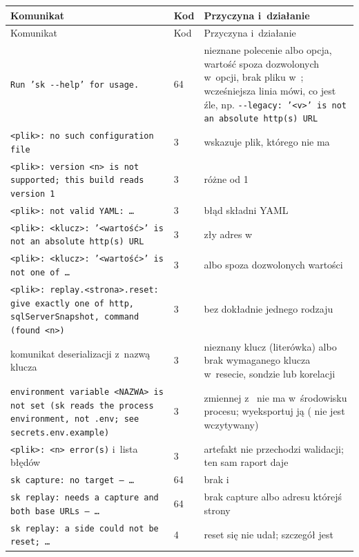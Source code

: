 {\footnotesize
\begin{xltabular}{\linewidth}{@{}>{\raggedright\arraybackslash}p{6.4cm} l >{\raggedright\arraybackslash}X@{}}
\toprule
Komunikat & Kod & Przyczyna i~działanie \\
\midrule
\endfirsthead
\toprule
Komunikat & Kod & Przyczyna i~działanie \\
\midrule
\endhead
\bottomrule
\endlastfoot
\texttt{Run 'sk -{}-help' for usage.} & 64 & nieznane polecenie albo opcja, wartość spoza
dozwolonych w~opcji, brak pliku w~; wcześniejsza linia mówi, co jest
źle, np. \texttt{-{}-legacy: '<v>' is not an absolute http(s) URL} \\
\texttt{<plik>: no such configuration file} & 3 &  wskazuje plik,
którego nie ma \\
\texttt{<plik>: version <n> is not supported; this build reads version 1} & 3 &
 różne od 1 \\
\texttt{<plik>: not valid YAML: …} & 3 & błąd składni YAML \\
\texttt{<plik>: <klucz>: '<wartość>' is not an absolute http(s) URL} & 3 & zły adres
w~ \\
\texttt{<plik>: <klucz>: '<wartość>' is not one of …} & 3 &  albo
 spoza dozwolonych wartości \\
\texttt{<plik>: replay.<strona>.reset: give exactly one of http, sqlServerSnapshot, command
(found <n>)} & 3 &  bez dokładnie jednego rodzaju \\
komunikat deserializacji z~nazwą klucza & 3 & nieznany klucz (literówka) albo brak
wymaganego klucza w~resecie, sondzie lub korelacji \\
\texttt{environment variable <NAZWA> is not set (sk reads the process environment, not
.env; see secrets.env.example)} & 3 & zmiennej z~ nie ma
w~środowisku procesu; wyeksportuj ją ( nie jest wczytywany) \\
\texttt{<plik>: <n> error(s)} i~lista błędów & 3 & artefakt nie przechodzi walidacji; ten
sam raport daje  \\
\texttt{sk capture: no target — …} & 64 & brak 
i~ \\
\texttt{sk replay: needs a capture and both base URLs — …} & 64 & brak capture albo
adresu którejś strony \\
\texttt{sk replay: a side could not be reset; …} & 4 & reset się nie udał; szczegół jest

\end{xltabular}}
